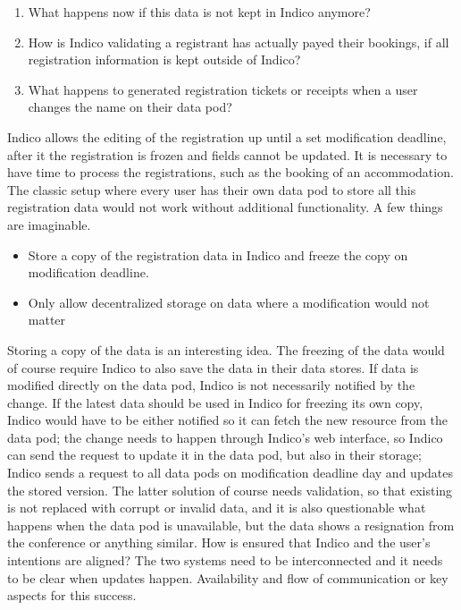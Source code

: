 \begin{enumerate}
    \item What happens now if this data is not kept in Indico anymore?
    \item How is Indico validating a registrant has actually payed their bookings, if all registration information is kept outside of Indico?
    \item What happens to generated registration tickets or receipts when a user changes the name on their data pod?
\end{enumerate}

Indico allows the editing of the registration up until a set modification deadline, after it the registration is frozen and fields cannot be updated. It is necessary to have time to process the registrations, such as the booking of an accommodation. The classic setup where every user has their own data pod to store all this registration data would not work without additional functionality. A few things are imaginable.

\begin{itemize}
    \item Store a copy of the registration data in Indico and freeze the copy on modification deadline.
    \item Only allow decentralized storage on data where a modification would not matter
\end{itemize}

Storing a copy of the data is an interesting idea. The freezing of the data would of course require Indico to also save the data in their data stores. If data is modified directly on the data pod, Indico is not necessarily notified by the change. If the latest data should be used in Indico for freezing its own copy, Indico would have to be either notified so it can fetch the new resource from the data pod; the change needs to happen through Indico's web interface, so Indico can send the request to update it in the data pod, but also in their storage; Indico sends a request to all data pods on modification deadline day and updates the stored version. The latter solution of course needs validation, so that existing is not replaced with corrupt or invalid data, and it is also questionable what happens when the data pod is unavailable, but the data shows a resignation from the conference or anything similar. How is ensured that Indico and the user's intentions are aligned? The two systems need to be interconnected and it needs to be clear when updates happen. Availability and flow of communication or key aspects for this success.
\vspace{0.5cm}
